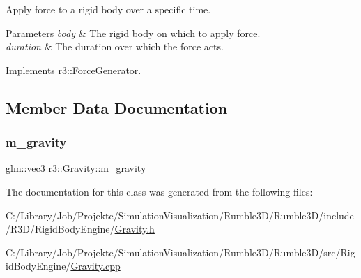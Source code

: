 Apply force to a rigid body over a specific time. 


\begin{DoxyParams}{Parameters}
{\em body} & The rigid body on which to apply force. \\
\hline
{\em duration} & The duration over which the force acts. \\
\hline
\end{DoxyParams}


Implements \mbox{\hyperlink{classr3_1_1_force_generator_a69bebbde8cef792d6636af50037af2aa}{r3\+::\+Force\+Generator}}.



\subsection{Member Data Documentation}
\mbox{\label{classr3_1_1_gravity_a2feb1d84fc4118e6e30b707a7224f6ef}} 
\subsubsection{\texorpdfstring{m\+\_\+gravity}{m\_gravity}}
{\footnotesize\ttfamily glm\+::vec3 r3\+::\+Gravity\+::m\+\_\+gravity\hspace{0.3cm}{\ttfamily [protected]}}



The documentation for this class was generated from the following files\+:\begin{DoxyCompactItemize}
\item 
C\+:/\+Library/\+Job/\+Projekte/\+Simulation\+Visualization/\+Rumble3\+D/\+Rumble3\+D/include/\+R3\+D/\+Rigid\+Body\+Engine/\mbox{\hyperlink{_gravity_8h}{Gravity.\+h}}\item 
C\+:/\+Library/\+Job/\+Projekte/\+Simulation\+Visualization/\+Rumble3\+D/\+Rumble3\+D/src/\+Rigid\+Body\+Engine/\mbox{\hyperlink{_gravity_8cpp}{Gravity.\+cpp}}\end{DoxyCompactItemize}
